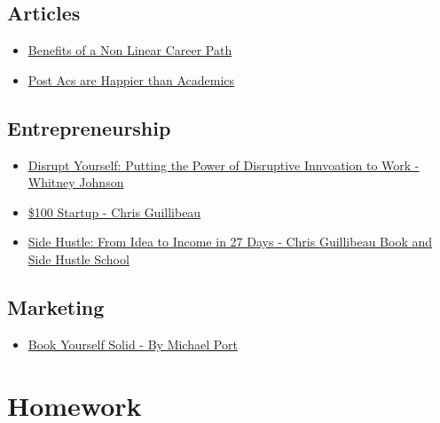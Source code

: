 \documentclass[]{book}
\providecommand{\tightlist}{%
  \setlength{\itemsep}{0pt}\setlength{\parskip}{0pt}}
\theoremstyle{definition}
\theoremstyle{definition}
\theoremstyle{definition}
\theoremstyle{remark}
\begin{document}
\subsection{Articles}\label{articles}

\begin{itemize}
\tightlist
\item
  \href{https://medium.com/design-leadership/benefits-of-a-non-linear-design-career-path-d0add49a90c8}{Benefits
  of a Non Linear Career Path}
\item
  \href{https://www.insidehighered.com/news/2017/12/18/study-humanities-and-social-science-phds-working-outside-academe-are-happier-their?utm_source=Inside+Higher+Ed}{Post
  Acs are Happier than Academics}
\end{itemize}

\subsection{Entrepreneurship}\label{entrepreneurship}

\begin{itemize}
\tightlist
\item
  \href{https://www.amazon.com/Disrupt-Yourself-Putting-Disruptive-Innovation-ebook/dp/B00VQOA26Q}{Disrupt
  Yourself: Putting the Power of Disruptive Innvoation to Work - Whitney
  Johnson}
\item
  \href{https://www.amazon.com/dp/B0067TGSOK/ref=dp-kindle-redirect?_encoding=UTF8\&btkr=1}{\$100
  Startup - Chris Guillibeau}
\item
  \href{https://sidehustleschool.com/}{Side Hustle: From Idea to Income
  in 27 Days - Chris Guillibeau Book and Side Hustle School}
\end{itemize}

\subsection{Marketing}\label{marketing}

\begin{itemize}
\tightlist
\item
  \href{https://www.amazon.com/Book-Yourself-Solid-Reliable-Marketing/dp/0470643471}{Book
  Yourself Solid - By Michael Port}
\end{itemize}

\section{Homework}\label{homework-2}
\end{document}
